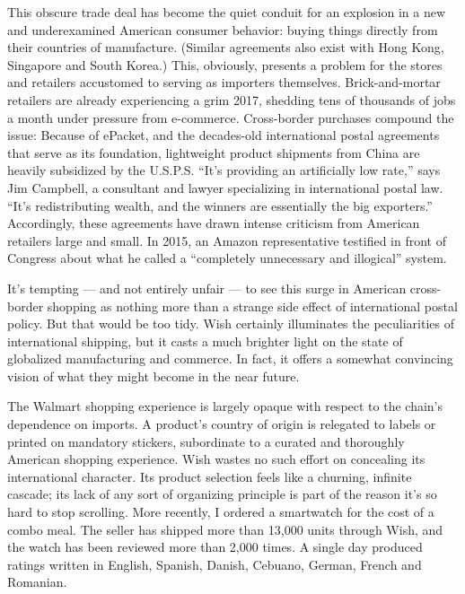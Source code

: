 This obscure trade deal has become the quiet conduit for an explosion in
a new and underexamined American consumer behavior: buying things
directly from their countries of manufacture. (Similar agreements also
exist with Hong Kong, Singapore and South Korea.) This, obviously,
presents a problem for the stores and retailers accustomed to serving as
importers themselves. Brick-and-mortar retailers are already
experiencing a grim 2017, shedding tens of thousands of jobs a month
under pressure from e-commerce. Cross-border purchases compound the
issue: Because of ePacket, and the decades-old international postal
agreements that serve as its foundation, lightweight product shipments
from China are heavily subsidized by the U.S.P.S. ``It's providing an
artificially low rate,'' says Jim Campbell, a consultant and lawyer
specializing in international postal law. ``It's redistributing wealth,
and the winners are essentially the big exporters.'' Accordingly, these
agreements have drawn intense criticism from American retailers large
and small. In 2015, an Amazon representative testified in front of
Congress about what he called a ``completely unnecessary and illogical''
system.

It's tempting --- and not entirely unfair --- to see this surge in
American cross-border shopping as nothing more than a strange side
effect of international postal policy. But that would be too tidy. Wish
certainly illuminates the peculiarities of international shipping, but
it casts a much brighter light on the state of globalized manufacturing
and commerce. In fact, it offers a somewhat convincing vision of what
they might become in the near future.

The Walmart shopping experience is largely opaque with respect to the
chain's dependence on imports. A product's country of origin is
relegated to labels or printed on mandatory stickers, subordinate to a
curated and thoroughly American shopping experience. Wish wastes no such
effort on concealing its international character. Its product selection
feels like a churning, infinite cascade; its lack of any sort of
organizing principle is part of the reason it's so hard to stop
scrolling. More recently, I ordered a smartwatch for the cost of a combo
meal. The seller has shipped more than 13,000 units through Wish, and
the watch has been reviewed more than 2,000 times. A single day produced
ratings written in English, Spanish, Danish, Cebuano, German, French and
Romanian.

